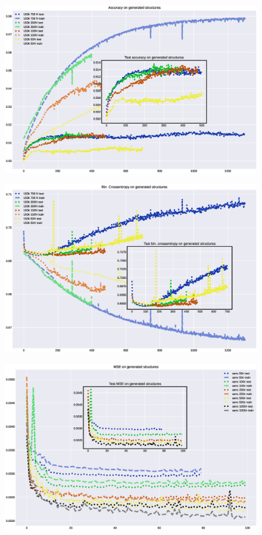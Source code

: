 \documentclass{article}
\begin{document}
\begin{figure}[h!tp]
\centering
\includegraphics[scale=.500]{imgs/acc-lsize.eps}
\caption{}
\label{}
\end{figure}

\begin{figure}[h!tp]
\centering
\includegraphics[scale=.500]{imgs/loss-lsize.eps}
\caption{}
\label{}
\end{figure}

\begin{figure}[htp]
\centering
\includegraphics[scale=0.50]{imgs/loss-aenc.eps}
\caption{}
\label{}
\end{figure}
\end{document}
